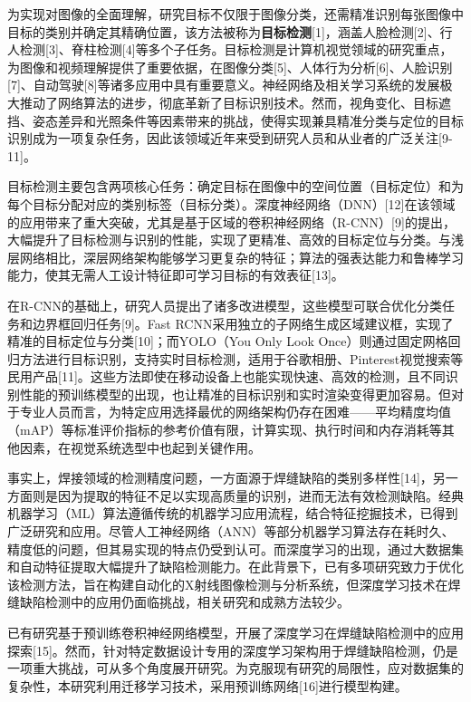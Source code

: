 为实现对图像的全面理解，研究目标不仅限于图像分类，还需精准识别每张图像中目标的类别并确定其精确位置，该方法被称为\textbf{目标检测}{[}1{]}，涵盖人脸检测{[}2{]}、行人检测{[}3{]}、脊柱检测{[}4{]}等多个子任务。目标检测是计算机视觉领域的研究重点，为图像和视频理解提供了重要依据，在图像分类{[}5{]}、人体行为分析{[}6{]}、人脸识别{[}7{]}、自动驾驶{[}8{]}等诸多应用中具有重要意义。神经网络及相关学习系统的发展极大推动了网络算法的进步，彻底革新了目标识别技术。然而，视角变化、目标遮挡、姿态差异和光照条件等因素带来的挑战，使得实现兼具精准分类与定位的目标识别成为一项复杂任务，因此该领域近年来受到研究人员和从业者的广泛关注{[}9-11{]}。

目标检测主要包含两项核心任务：确定目标在图像中的空间位置（目标定位）和为每个目标分配对应的类别标签（目标分类）。深度神经网络（DNN）{[}12{]}在该领域的应用带来了重大突破，尤其是基于区域的卷积神经网络（R-CNN）{[}9{]}的提出，大幅提升了目标检测与识别的性能，实现了更精准、高效的目标定位与分类。与浅层网络相比，深层网络架构能够学习更复杂的特征；算法的强表达能力和鲁棒学习能力，使其无需人工设计特征即可学习目标的有效表征{[}13{]}。

在R-CNN的基础上，研究人员提出了诸多改进模型，这些模型可联合优化分类任务和边界框回归任务{[}9{]}。Fast
RCNN采用独立的子网络生成区域建议框，实现了精准的目标定位与分类{[}10{]}；而YOLO（You
Only Look
Once）则通过固定网格回归方法进行目标识别，支持实时目标检测，适用于谷歌相册、Pinterest视觉搜索等民用产品{[}11{]}。这些方法即使在移动设备上也能实现快速、高效的检测，且不同识别性能的预训练模型的出现，也让精准的目标识别和实时渲染变得更加容易。但对于专业人员而言，为特定应用选择最优的网络架构仍存在困难------平均精度均值（mAP）等标准评价指标的参考价值有限，计算实现、执行时间和内存消耗等其他因素，在视觉系统选型中也起到关键作用。

事实上，焊接领域的检测精度问题，一方面源于焊缝缺陷的类别多样性{[}14{]}，另一方面则是因为提取的特征不足以实现高质量的识别，进而无法有效检测缺陷。经典机器学习（ML）算法遵循传统的机器学习应用流程，结合特征挖掘技术，已得到广泛研究和应用。尽管人工神经网络（ANN）等部分机器学习算法存在耗时久、精度低的问题，但其易实现的特点仍受到认可。而深度学习的出现，通过大数据集和自动特征提取大幅提升了缺陷检测能力。在此背景下，已有多项研究致力于优化该检测方法，旨在构建自动化的X射线图像检测与分析系统，但深度学习技术在焊缝缺陷检测中的应用仍面临挑战，相关研究和成熟方法较少。

已有研究基于预训练卷积神经网络模型，开展了深度学习在焊缝缺陷检测中的应用探索{[}15{]}。然而，针对特定数据设计专用的深度学习架构用于焊缝缺陷检测，仍是一项重大挑战，可从多个角度展开研究。为克服现有研究的局限性，应对数据集的复杂性，本研究利用迁移学习技术，采用预训练网络{[}16{]}进行模型构建。

